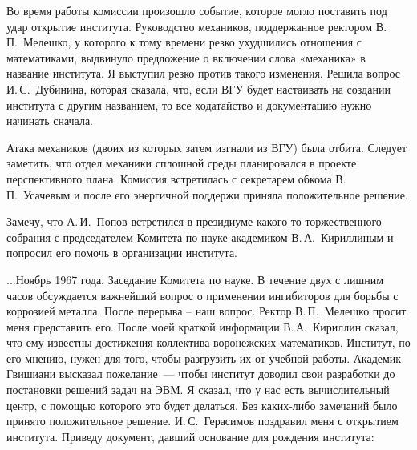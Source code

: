Во время работы комиссии произошло событие, которое могло поставить под удар открытие института.
Руководство механиков, поддержанное ректором В.\,П.~Мелешко,
у которого к тому времени резко ухудшились отношения с математиками,
выдвинуло предложение о включении слова «механика» в название института.
Я выступил резко против такого изменения.
Решила вопрос И.\,С.~Дубинина, которая сказала, что, если ВГУ будет настаивать на создании института с другим названием,
то все ходатайство и документацию нужно начинать сначала.

Атака механиков (двоих из которых затем изгнали из ВГУ) была отбита.
Следует заметить, что отдел механики сплошной среды планировался в проекте перспективного плана.
Комиссия встретилась с секретарем обкома В.\,П.~Усачевым и после его энергичной поддержи приняла положительное решение.

Замечу, что А.\,И.~Попов встретился в президиуме какого-то торжественного собрания
с председателем Комитета по науке академиком В.\,А.~Кириллиным и попросил его помочь в организации института.

...Ноябрь 1967 года. Заседание Комитета по науке.
В течение двух с лишним часов обсуждается важнейший вопрос о применении ингибиторов для борьбы с коррозией металла.
После перерыва – наш вопрос. Ректор В.\,П.~Мелешко просит меня представить его.
После моей краткой информации В.\,А.~Кириллин сказал, что ему известны достижения коллектива воронежских математиков.
Институт, по его мнению, нужен для того, чтобы разгрузить их от учебной работы.
Академик Гвишиани высказал пожелание~--- чтобы институт доводил свои разработки до постановки решений задач на ЭВМ.
Я сказал, что у нас есть вычислительный центр, с помощью которого это будет делаться.
Без каких-либо замечаний было принято положительное решение.
И.\,С.~Герасимов поздравил меня с открытием института. Приведу документ, давший основание для рождения института:

